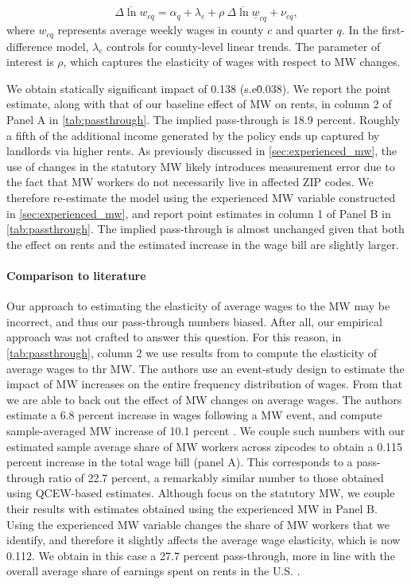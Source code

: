\begin{equation}
	\overline{\Delta \ln w}_{cq} = \alpha_{q} + \lambda_{c} 
							+ \rho \ \overline{\Delta \ln \underline{w}}_{cq}
							+ \nu_{cq} ,
\end{equation}
where $w_{cq}$ represents average weekly wages in county $c$ and quarter $q$. In the 
first-difference model, $\lambda_{c}$ controls for county-level linear trends. The parameter of 
interest is $\rho$, which captures the elasticity of wages with respect to MW changes.

We obtain statically significant impact of 0.138 (s.e\. 0.038). We report the point estimate, 
along with that of our baseline effect of MW on rents, in column 2 of Panel A in 
\autoref{tab:passthrough}. The implied pass-through is 18.9 percent. Roughly a fifth of the 
additional income generated by the policy ends up captured by landlords via higher rents. As 
previously discussed in \autoref{sec:experienced_mw}, the use of changes in the statutory 
MW likely introduces measurement error due to the fact that MW workers do not necessarily 
live in affected ZIP codes. We therefore re-estimate the model using the experienced MW 
variable constructed in \autoref{sec:experienced_mw}, and report point estimates in column 
1 of Panel B in \autoref{tab:passthrough}. The implied pass-through is almost unchanged given 
that both the effect on rents and the estimated increase in the wage bill are slightly larger.

\paragraph{Comparison to literature} Our approach to estimating the elasticity of average wages
to the MW may be incorrect, and thus our pass-through numbers biased. After all, our empirical
approach was not crafted to answer this question. For this reason, in \autoref{tab:passthrough}, 
column 2 we use results from \textcite{CegnizEtAl2019} to compute the elasticity of average wages 
to thr MW. The authors use an event-study design to estimate the impact of MW increases on the 
entire frequency distribution of wages. From that we are able to back out the effect of MW 
changes on average wages. The authors estimate a 6.8 percent increase in wages following a MW
event, and compute sample-averaged MW increase of 10.1 percent \parencite[][Table I]
{CegnizEtAl2019}. We couple such numbers with our estimated sample average share of MW workers 
across zipcodes to obtain a 0.115 percent increase in the total wage bill (panel A). This 
corresponds to a pass-through ratio of 22.7 percent, a remarkably similar number to those 
obtained using QCEW-based estimates. Although \textcite{CegnizEtAl2019} focus on the statutory MW, 
we couple their results with estimates obtained using the experienced MW in Panel B. Using the 
experienced MW variable changes the share of MW workers that we identify, and therefore it 
slightly affects the average wage elasticity, which is now 0.112. We obtain in this case a 
27.7 percent pass-through, more in line with the overall average share of earnings spent on 
rents in the U.S. \parencite{fernald2020americas}.   

